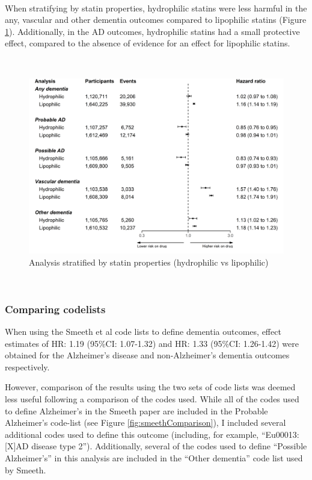 \documentclass[a4paper, twoside]{templates/ociamthesis}
\begin{document}
~

When stratifying by statin properties, hydrophilic statins were less harmful in the any, vascular and other dementia outcomes compared to lipophilic statins (Figure \ref{fig:statinTypeFig}). Additionally, in the AD outcomes, hydrophilic statins had a small protective effect, compared to the absence of evidence for an effect for lipophilic statins.

~





\begin{figure}[H]
\includegraphics[width=1\linewidth]{figures/cprd-analysis/forester_sta_type} \caption[Analysis stratified by statin properties]{Analysis stratified by statin properties (hydrophilic vs lipophilic)}\label{fig:statinTypeFig}
\end{figure}

~

\hypertarget{comparing-codelists}{%
\subsubsection{Comparing codelists}\label{comparing-codelists}}

When using the Smeeth et al code lists to define dementia outcomes, effect estimates of HR: 1.19 (95\%CI: 1.07-1.32) and HR: 1.33 (95\%CI: 1.26-1.42) were obtained for the Alzheimer's disease and non-Alzheimer's dementia outcomes respectively.

However, comparison of the results using the two sets of code lists was deemed less useful following a comparison of the codes used. While all of the codes used to define Alzheimer's in the Smeeth paper are included in the Probable Alzheimer's code-list (see Figure \ref{fig:smeethComparison}), I included several additional codes used to define this outcome (including, for example, ``Eu00013: {[}X{]}AD disease type 2''). Additionally, several of the codes used to define ``Possible Alzheimer's'' in this analysis are included in the ``Other dementia'' code list used by Smeeth.
\end{document}
